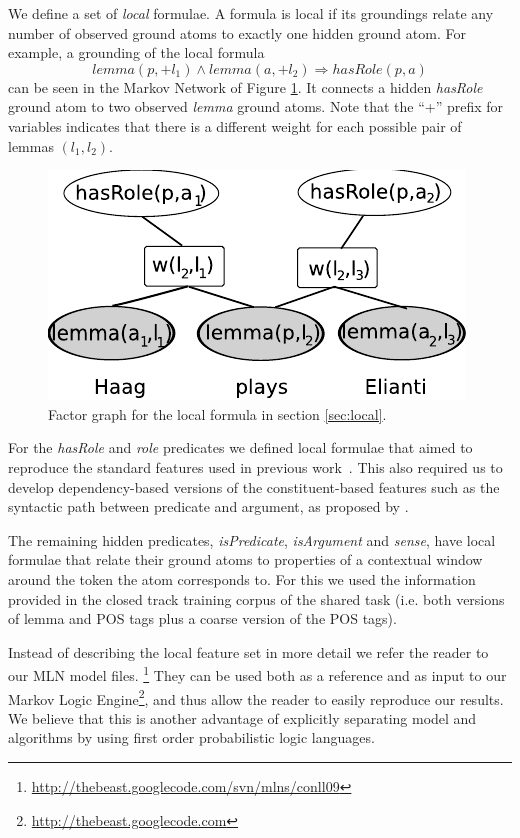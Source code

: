 


We define a set of \emph{local} formulae. A formula is local if its groundings relate any number of observed ground atoms to exactly one hidden ground atom. For example, a grounding of the local formula 
\[lemma(p,+l_1) \wedge lemma(a,+l_2) \Rightarrow hasRole(p,a)\]
can be seen in the Markov Network of Figure \ref{fig:local2}. It connects a hidden \emph{hasRole} ground atom to two observed \emph{lemma} ground atoms. Note that the ``+'' prefix for variables indicates that there is a different weight for each possible pair of lemmas $(l_1,l_2)$.


\begin{figure}
\begin{center}
    \includegraphics[scale=.70]{LocalFormula2}
\end{center}
\caption{Factor graph for the local formula in section \ref{sec:local}.}
\label{fig:local2}
\end{figure}


For the \emph{hasRole} and \emph{role} predicates we defined local formulae that aimed to reproduce the standard features used in previous work~\citep{xue04calibrating}. This also required us to develop dependency-based versions of the constituent-based features such as the syntactic path between predicate and argument, as proposed by \cite{xue04calibrating}. 

The remaining hidden predicates, \emph{isPredicate}, \emph{isArgument} and \emph{sense}, have local formulae that relate their ground atoms to properties of a contextual window around the token the atom corresponds to. For this we used the information provided in the closed track training corpus of the shared task (i.e. both versions of lemma and POS tags plus a coarse version of the POS tags). 

Instead of describing the local feature set in more detail we refer the reader 
to our MLN model files. 
\footnote{\url{http://thebeast.googlecode.com/svn/mlns/conll09}} They can be 
used both as a reference and as input to our Markov Logic 
Engine\footnote{\url{http://thebeast.googlecode.com}}, and thus allow the reader 
to easily reproduce our results. We believe that this is another advantage of 
explicitly separating model and algorithms by using first order probabilistic 
logic languages.

